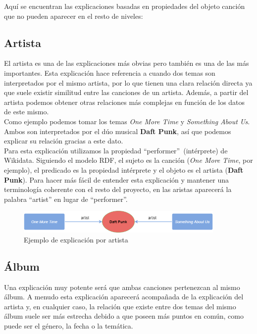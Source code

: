 Aquí se encuentran las explicaciones basadas en propiedades del objeto canción que no pueden aparecer en el resto de niveles:

\subsection*{Artista}

El artista es una de las explicaciones más obvias pero también es una de las más importantes. Esta explicación hace referencia a cuando dos temas son interpretados por el mismo artista, por lo que tienen una clara relación directa ya que suele existir similitud entre las canciones de un artista. Además, a partir del artista podemos obtener otras relaciones más complejas en función de los datos de este mismo.\\

Como ejemplo podemos tomar los temas \textit{One More Time} y \textit{Something About Us}. Ambos son interpretados por el dúo musical \textbf{Daft Punk}, así que podemos explicar su relación gracias a este dato.\\

Para esta explicación utilizamos la propiedad ``performer''~(intérprete) de Wikidata. Siguiendo el modelo RDF, el sujeto es la canción (\textit{One More Time}, por ejemplo), el predicado es la propiedad intérprete y el objeto es el artista (\textbf{Daft Punk}). Para hacer más fácil de entender esta explicación y mantener una terminología coherente con el resto del proyecto, en las aristas aparecerá la palabra ``artist'' en lugar de ``performer''.\\

\begin{figure}[h!]
	\centering
	\includegraphics[width = 0.9\textwidth]{Imagenes/Bitmap/Artista ejemplo.png}
	\caption{Ejemplo de explicación por artista}
	\label{fig:sampleImage}
\end{figure}

\subsection*{Álbum}

Una explicación muy potente será que ambas canciones pertenezcan al mismo álbum. A menudo esta explicación aparecerá acompañada de la explicación del artista y, en cualquier caso, la relación que existe entre dos temas del mismo álbum suele ser más estrecha debido a que poseen más puntos en común, como puede ser el género, la fecha o la temática.\\

